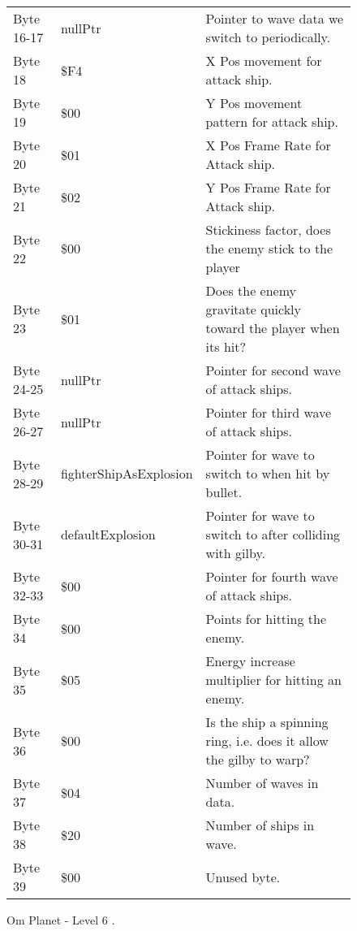 \begin{figure}[H]
{\begin{adjustbox}{width=12cm}
\begin{tabular}{lll}
 Byte 16-17 & nullPtr                & Pointer to wave data we switch to periodically.                     \\
 Byte 18    & \$F4                    & X Pos movement for attack ship.                                     \\
 Byte 19    & \$00                    & Y Pos movement pattern for attack ship.                             \\
 Byte 20    & \$01                    & X Pos Frame Rate for Attack ship.                                   \\
 Byte 21    & \$02                    & Y Pos Frame Rate for Attack ship.                                   \\
 Byte 22    & \$00                    & Stickiness factor, does the enemy stick to the player               \\
 Byte 23    & \$01                    & Does the enemy gravitate quickly toward the player when its hit?    \\
 Byte 24-25 & nullPtr                & Pointer for second wave of attack ships.                            \\
 Byte 26-27 & nullPtr                & Pointer for third wave of attack ships.                             \\
 Byte 28-29 & fighterShipAsExplosion & Pointer for wave to switch to when hit by bullet.                   \\
 Byte 30-31 & defaultExplosion       & Pointer for  wave to switch to after colliding with gilby.          \\
 Byte 32-33 & \$00                    & Pointer for fourth wave of attack ships.                            \\
 Byte 34    & \$00                    & Points for hitting the enemy.                                       \\
 Byte 35    & \$05                    & Energy increase multiplier for hitting an enemy.                    \\
 Byte 36    & \$00                    & Is the ship a spinning ring, i.e. does it allow the gilby to warp?  \\
 Byte 37    & \$04                    & Number of waves in data.                                            \\
 Byte 38    & \$20                    & Number of ships in wave.                                            \\
 Byte 39    & \$00                    & Unused byte.                                                        \\
\bottomrule
\end{tabular}

  \end{adjustbox}

  }\caption*{Om Planet - Level 6
.}
\end{figure}


